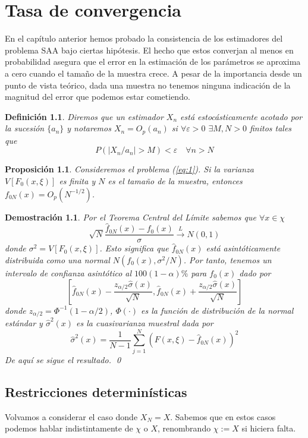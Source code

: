 \documentclass[twoside,a4paper,openright,12pt]{book}
\newtheorem{defi}{Definici\'on}[section]
\newtheorem{prop}{Proposici\'on}[section]
\newtheorem*{dem}{Demostración}
\providecommand{\conv}[1]{\overset{#1}{\longrightarrow}}
\begin{document}
\chapter{Tasa de convergencia}
En el capítulo anterior hemos probado la consistencia de los estimadores del problema SAA bajo ciertas hipótesis. El hecho que estos converjan al menos en probabilidad asegura que el error en la estimación de los parámetros se aproxima a cero cuando el tamaño de la muestra crece. A pesar de la importancia desde un punto de vista teórico, dada una muestra no tenemos ninguna indicación de la magnitud del error que podemos estar cometiendo. 
\begin{defi}
Diremos que un estimador $X_n$ está estocásticamente acotado por la sucesión $\{a_n\}$ y notaremos $X_n = O_p(a_n)$ si $\forall \varepsilon>0$ $\exists M,N>0$ finitos tales que
$$
P(|X_n/a_n|>M)<\varepsilon \quad \forall n>N
$$
\end{defi}
\begin{prop}
Consideremos el problema (\ref{eq:1}). Si la varianza $V[F_0(x,\xi)]$ es finita y $N$ es el tamaño de la muestra, entonces $f_{0N}(x)=O_p(N^{-1/2})$.
\end{prop} 
\begin{dem}
Por el Teorema Central del Límite sabemos que $\forall x \in \chi$
$$
\sqrt{N}\frac{\hat{f}_{0N}(x)-f_0(x)}{\sigma} \conv{L} N(0,1)$$
donde $\sigma^2 = V[F_0(x,\xi)]$. Esto significa que $\hat{f}_{0N}(x)$ está asintóticamente distribuida como una normal $N(f_0(x),\sigma^2/N)$. Por tanto, tenemos un intervalo de confianza asintótico al $100(1-\alpha)\%$ para $f_0(x)$ dado por
$$
\left[ \hat{f}_{0N}(x)-\frac{z_{\alpha/2}\hat{\sigma}(x)}{\sqrt{N}},\hat{f}_{0N}(x)+\frac{z_{\alpha/2}\hat{\sigma}(x)}{\sqrt{N}} \right]
$$
donde $z_{\alpha/2}=\Phi^{-1}(1-\alpha/2)$, $\Phi(\cdot)$ es la función de distribución de la normal estándar y $\hat{\sigma}^2(x)$ es la cuasivarianza muestral dada por
$$
\hat{\sigma}^2(x) = \frac{1}{N-1}\sum_{j=1}^N\left(F(x,\xi)-\hat{f}_{0N}(x)\right)^2
$$
De aquí se sigue el resultado. \qed
\end{dem}
\newpage
\section{Restricciones determinísticas}
Volvamos a considerar el caso donde $X_N=X$. Sabemos que en estos casos podemos hablar indistintamente de $\chi$ o $X$, renombrando $\chi:=X$ si hiciera falta.
\end{document}
